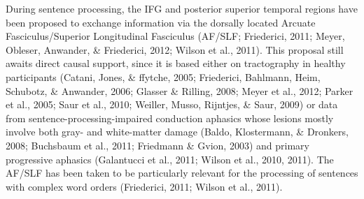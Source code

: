 During sentence processing, the IFG and posterior superior temporal regions have been proposed to exchange information via
 the dorsally located Arcuate Fasciculus/Superior Longitudinal Fasciculus (AF/SLF; Friederici, 2011; Meyer, Obleser, Anwander, \& Friederici, 2012; Wilson et al., 2011). This proposal still awaits direct causal support, since it is based either on tractography in healthy participants (Catani, Jones, \& ffytche, 2005; Friederici, Bahlmann, Heim, Schubotz, \& Anwander, 2006; Glasser \& Rilling, 2008; Meyer et al., 2012; Parker et al., 2005; Saur et al., 2010; Weiller, Musso, Rijntjes, \& Saur, 2009) or data from sentence-processing-impaired conduction aphasics whose lesions mostly involve both gray- and white-matter damage (Baldo, Klostermann, \& Dronkers, 2008; Buchsbaum et al., 2011; Friedmann \& Gvion, 2003) and primary progressive aphasics (Galantucci et al., 2011; Wilson et al., 2010, 2011). The AF/SLF has been taken to be particularly relevant for the
 processing of sentences with complex word orders (Friederici,
 2011; Wilson et al., 2011).

